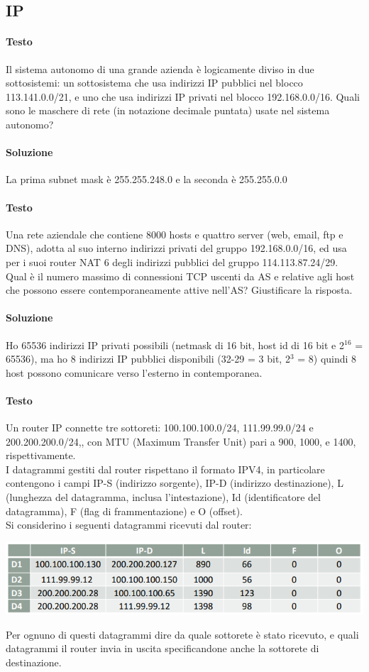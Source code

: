 \documentclass[10pt]{article}
\begin{document}
\subsection{IP}
\paragraph{Testo} Il sistema autonomo di una grande azienda è logicamente diviso in due sottosistemi: un sottosistema che usa indirizzi IP pubblici nel blocco 113.141.0.0/21, e uno che usa indirizzi IP privati nel blocco 192.168.0.0/16. Quali sono le maschere di rete (in notazione decimale puntata) usate nel sistema autonomo?
\paragraph{Soluzione} La prima subnet mask è 255.255.248.0 e la seconda è 255.255.0.0
\paragraph{Testo} Una rete aziendale che contiene 8000 hosts e quattro server (web, email, ftp e DNS), adotta al suo interno indirizzi privati del gruppo 192.168.0.0/16, ed usa per i suoi router NAT 6 degli indirizzi pubblici del gruppo 114.113.87.24/29.\\
Qual è il numero massimo di connessioni TCP uscenti da AS e relative agli host che possono essere contemporaneamente attive nell’AS? Giustificare la risposta.
\paragraph{Soluzione} Ho 65536 indirizzi IP privati possibili (netmask di 16 bit, host id di 16 bit e 2$^{16}$ = 65536), ma ho 8 indirizzi IP pubblici disponibili (32-29 = 3 bit, 2$^3$ = 8) quindi 8 host possono comunicare verso l'esterno in contemporanea.
\pagebreak
\paragraph{Testo} Un router IP connette tre sottoreti: 100.100.100.0/24, 111.99.99.0/24 e 200.200.200.0/24,, con MTU (Maximum Transfer Unit) pari a 900, 1000, e 1400, rispettivamente.\\
I datagrammi gestiti dal router rispettano il formato IPV4, in particolare contengono i campi IP-S (indirizzo sorgente), IP-D (indirizzo destinazione), L (lunghezza del datagramma, inclusa l’intestazione), Id (identificatore del datagramma), F (flag di frammentazione) e O (offset).\\
Si considerino i seguenti datagrammi ricevuti dal router:
\begin{center}
\includegraphics[scale=0.7]{ipes2_tabella.png}
\end{center}
Per ognuno di questi datagrammi dire da quale sottorete è stato ricevuto, e quali datagrammi il router invia in uscita specificandone anche la sottorete di destinazione.
\end{document}
